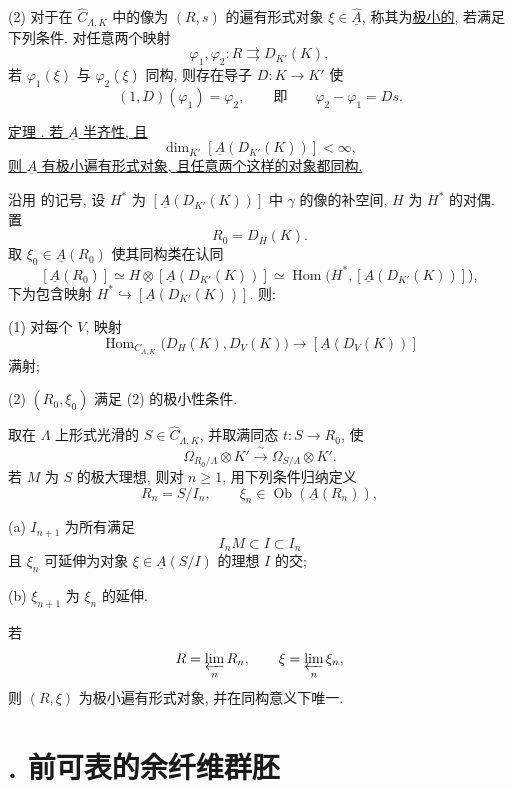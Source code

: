 (2) 对于在 $\widehat C_{\Lambda,K}$ 中的像为 $(R,s)$ 的遍有形式对象
$\xi\in\widehat{\underline A}$, 称其为\underline{极小的}, 若满足下列条件.
对任意两个映射
\[
 \varphi_1,\varphi_2:R\rightrightarrows D_{K'}(K),
\]
若 $\varphi_1(\xi)$ 与 $\varphi_2(\xi)$ 同构,
则存在导子 $D:K\longrightarrow K'$ 使
\[
 (1,D)(\varphi_1)=\varphi_2,
 \qquad\text{即}\qquad
 \varphi_2-\varphi_1=Ds.
\]

\underline{定理 .
若 $\underline A$ 半齐性, 且}
\[
 \dim_{K'}[\underline A(D_{K'}(K))]<\infty,
\]
\underline{则 $\underline A$ 有极小遍有形式对象, 且任意两个这样的对象都同构.}


沿用  的记号,
设 $H^*$ 为 $[\underline A(D_{K'}(K))]$ 中 $\gamma$ 的像的补空间,
$H$ 为 $H^*$ 的对偶. 置
\[
 R_0=D_H(K).
\]
取 $\xi_0\in\underline A(R_0)$ 使其同构类在认同
\[
 [\underline A(R_0)]
 \simeq H\otimes[\underline A(D_{K'}(K))]
 \simeq
 \operatorname{Hom}\bigl(H^*,[\underline A(D_{K'}(K))]\bigr),
\]
下为包含映射 $H^*\hookrightarrow[\underline A(D_{K'}(K))]$. 则:

(1) 对每个 $V$, 映射
\[
 \operatorname{Hom}_{C_{\Lambda,K}}
   \bigl(D_H(K),D_V(K)\bigr)
 \longrightarrow[\underline A(D_V(K))]
\]
满射;

(2) $(R_0,\xi_0)$ 满足 (2) 的极小性条件.

取在 $\Lambda$ 上形式光滑的 $S\in\widehat C_{\Lambda,K}$,
并取满同态 $t:S\longrightarrow R_0$, 使
\[
 \Omega_{R_0/\Lambda}\otimes K'
 \xrightarrow{\ \sim\ }
 \Omega_{S/\Lambda}\otimes K'.
\]
若 $M$ 为 $S$ 的极大理想, 则对 $n\geq1$, 用下列条件归纳定义
\[
 R_n=S/I_n,
 \qquad
 \xi_n\in\operatorname{Ob}(\underline A(R_n)),
\]

(a) $I_{n+1}$ 为所有满足
\[
 I_nM\subset I\subset I_n
\]
且 $\xi_n$ 可延伸为对象 $\xi\in\underline A(S/I)$ 的理想 $I$ 的交;

(b) $\xi_{n+1}$ 为 $\xi_n$ 的延伸.

若
\[
 R=\varprojlim_nR_n,
 \qquad
 \xi=\varprojlim_n\xi_n,
\]
则 $(R,\xi)$ 为极小遍有形式对象, 并在同构意义下唯一.


\section*{. 前可表的余纤维群胚}

